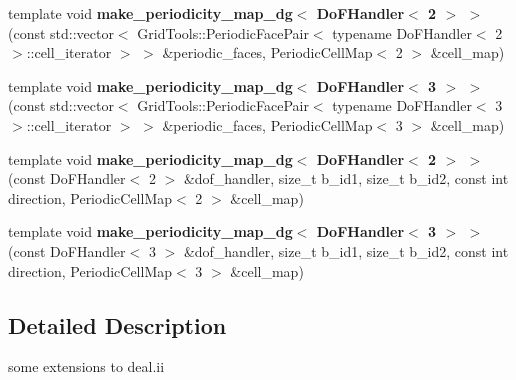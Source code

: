 \begin{DoxyCompactItemize}
\item 
\hypertarget{namespacenatrium_1_1DealIIExtensions_aa7db4d0d0c8236483eb98b0f09e79b89}{
template void {\bfseries make\_\-periodicity\_\-map\_\-dg$<$ DoFHandler$<$ 2 $>$ $>$} (const std::vector$<$ GridTools::PeriodicFacePair$<$ typename DoFHandler$<$ 2 $>$::cell\_\-iterator $>$ $>$ \&periodic\_\-faces, PeriodicCellMap$<$ 2 $>$ \&cell\_\-map)}
\label{namespacenatrium_1_1DealIIExtensions_aa7db4d0d0c8236483eb98b0f09e79b89}

\item 
\hypertarget{namespacenatrium_1_1DealIIExtensions_a9da850ee914812ca5d374fe70461f170}{
template void {\bfseries make\_\-periodicity\_\-map\_\-dg$<$ DoFHandler$<$ 3 $>$ $>$} (const std::vector$<$ GridTools::PeriodicFacePair$<$ typename DoFHandler$<$ 3 $>$::cell\_\-iterator $>$ $>$ \&periodic\_\-faces, PeriodicCellMap$<$ 3 $>$ \&cell\_\-map)}
\label{namespacenatrium_1_1DealIIExtensions_a9da850ee914812ca5d374fe70461f170}

\item 
\hypertarget{namespacenatrium_1_1DealIIExtensions_ae31f8793dc208deb99e34201a9c17779}{
template void {\bfseries make\_\-periodicity\_\-map\_\-dg$<$ DoFHandler$<$ 2 $>$ $>$} (const DoFHandler$<$ 2 $>$ \&dof\_\-handler, size\_\-t b\_\-id1, size\_\-t b\_\-id2, const int direction, PeriodicCellMap$<$ 2 $>$ \&cell\_\-map)}
\label{namespacenatrium_1_1DealIIExtensions_ae31f8793dc208deb99e34201a9c17779}

\item 
\hypertarget{namespacenatrium_1_1DealIIExtensions_a4d4a08bca6d3ef3833ba3a0107ea7fa8}{
template void {\bfseries make\_\-periodicity\_\-map\_\-dg$<$ DoFHandler$<$ 3 $>$ $>$} (const DoFHandler$<$ 3 $>$ \&dof\_\-handler, size\_\-t b\_\-id1, size\_\-t b\_\-id2, const int direction, PeriodicCellMap$<$ 3 $>$ \&cell\_\-map)}
\label{namespacenatrium_1_1DealIIExtensions_a4d4a08bca6d3ef3833ba3a0107ea7fa8}

\end{DoxyCompactItemize}


\subsection{Detailed Description}
some extensions to deal.ii 

